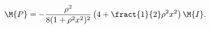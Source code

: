 \begin{equation}
\M{P} = -\frac{\rho^2}{8(1+\rho^2x^2)^2}\left(4+\fract{1}{2}\rho^2x^2 \right) \M{I}.
\label{2.31}
\end{equation}

